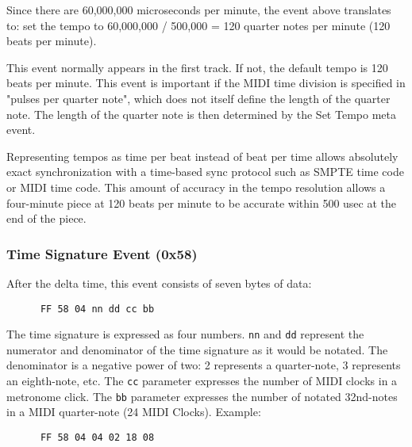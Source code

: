    Since there are 60,000,000 microseconds per minute, the event above
   translates to: set the tempo to 60,000,000 / 500,000 = 120 quarter notes per
   minute (120 beats per minute).

   This event normally appears in the first track. If not, the default tempo is
   120 beats per minute.  This event is important if the MIDI time division is
   specified in "pulses per quarter note", which does not itself define the
   length of the quarter note. The length of the quarter note is then
   determined by the Set Tempo meta event.

   Representing tempos as time per beat instead of beat per time allows
   absolutely exact synchronization with a time-based sync protocol
   such as SMPTE time code or MIDI time code.  This amount of accuracy
   in the tempo resolution allows a four-minute piece at 120 beats per minute
   to be accurate within 500 usec at the end of the piece.

\subsubsection{Time Signature Event (0x58)}
\label{subsubsec:midi_meta_time_sig}

   After the delta time, this event consists of seven bytes of data:

   \begin{verbatim}
      FF 58 04 nn dd cc bb
   \end{verbatim}

   The time signature is expressed as four numbers.
   \texttt{nn} and \texttt{dd} represent the numerator and denominator of the
   time signature as it would be notated.  The denominator is a negative power
   of two:  2 represents a quarter-note, 3 represents an eighth-note, etc.  The
   \texttt{cc} parameter expresses the number of MIDI clocks in a metronome
   click.  The \texttt{bb} parameter expresses the number of notated 32nd-notes
   in a MIDI quarter-note (24 MIDI Clocks).
   Example:

   \begin{verbatim}
      FF 58 04 04 02 18 08
   \end{verbatim}

